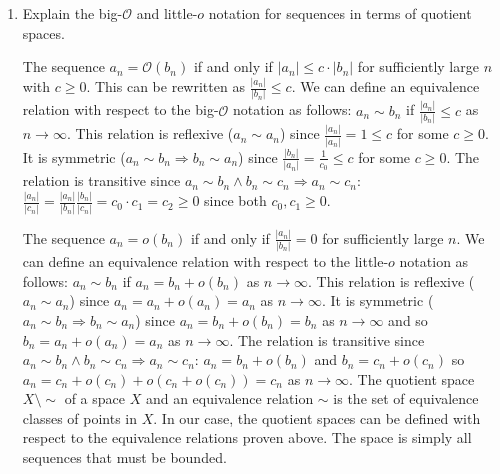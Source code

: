 \documentclass[12pt,letterpaper,reqno]{amsart}
\begin{document}
\begin{enumerate}[1.]
\begin{flushleft}
\end{flushleft}
\item Explain the big-$\mathcal{O}$ and little-$o$ notation for sequences in terms of quotient spaces.
\begin{flushleft}
    The sequence $a_n = \mathcal{O}(b_n)$ if and only if $|a_n| \leq c \cdot |b_n|$ for sufficiently large $n$ with $c \geq 0$. This can be rewritten as $\frac{|a_n|}{|b_n|} \leq c$. We can define an equivalence relation with respect to the big-$\mathcal{O}$ notation as follows: $a_n \sim b_n$ if $\frac{|a_n|}{|b_n|} \leq c$ as $n \rightarrow \infty$. This relation is reflexive ($a_n \sim a_n$) since $\frac{|a_n|}{|a_n|} = 1 \leq c$ for some $c \geq 0$. It is symmetric ($a_n \sim b_n \Rightarrow b_n \sim a_n$) since $\frac{|b_n|}{|a_n|} = \frac{1}{c_0} \leq c$ for some $c \geq 0$. The relation is transitive since $a_n \sim b_n \wedge b_n \sim c_n \Rightarrow a_n \sim c_n$: $\frac{|a_n|}{|c_n|} = \frac{|a_n|}{|b_n|}\frac{|b_n|}{|c_n|} = c_0\cdot c_1 = c_2 \geq 0$ since both $c_0, c_1 \geq 0$.\newline
    
    The sequence $a_n = o(b_n)$ if and only if $\frac{|a_n|}{|b_n|} = 0$ for sufficiently large $n$. We can define an equivalence relation with respect to the little-$o$ notation as follows: $a_n \sim b_n$ if $a_n = b_n + o(b_n)$ as $n \rightarrow \infty$. This relation is reflexive ($a_n \sim a_n$) since $a_n = a_n + o(a_n) = a_n$ as $n \rightarrow \infty$. It is symmetric ($a_n \sim b_n \Rightarrow b_n \sim a_n$) since $a_n = b_n + o(b_n) = b_n$ as $n \rightarrow \infty$ and so $b_n = a_n + o(a_n) = a_n$ as $n \rightarrow \infty$. The relation is transitive since $a_n \sim b_n \wedge b_n \sim c_n \Rightarrow a_n \sim c_n$: $a_n = b_n + o(b_n)$ and $b_n = c_n + o(c_n)$ so $a_n = c_n + o(c_n) + o(c_n + o(c_n)) = c_n$ as $n \rightarrow \infty$.\newline
    The quotient space $X\setminus\sim$ of a space $X$ and an equivalence relation $\sim$ is the set of equivalence classes of points in $X$. In our case, the quotient spaces can be defined with respect to the equivalence relations proven above. The space is simply all sequences that must be bounded.
\end{flushleft}
\end{enumerate}
\end{document}
